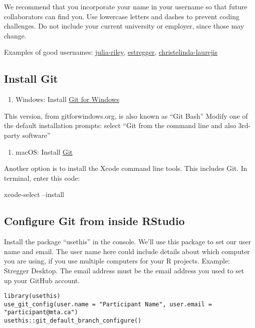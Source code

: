 \documentclass[
]{book}
\providecommand{\tightlist}{%
  \setlength{\itemsep}{0pt}\setlength{\parskip}{0pt}}
\begin{document}
We recommend that you incorporate your name in your username so that future collaborators can find you. Use lowercase letters and dashes to prevent coding challenges. Do not include your current university or employer, since those may change.

Examples of good usernames: \href{https://github.com/julia-riley}{julia-riley}, \href{https://github.com/estregger}{estregger}, \href{https://github.com/christelinda-laureijs}{christelinda-laurejis}

\subsection{Install Git}\label{install-git}

\begin{enumerate}
\def\labelenumi{\arabic{enumi}.}
\tightlist
\item
  Windows: Install \href{https://gitforwindows.org/}{Git for Windows}
\end{enumerate}

This version, from gitforwindows.org, is also known as ``Git Bash'' Modify one of the default installation prompts: select ``Git from the command line and also 3rd-party software''

\begin{enumerate}
\def\labelenumi{\arabic{enumi}.}
\setcounter{enumi}{1}
\tightlist
\item
  macOS: Install \href{https://git-scm.com/downloads}{Git}
\end{enumerate}

Another option is to install the Xcode command line tools. This includes Git. In terminal, enter this code:

xcode-select --install

\subsection{Configure Git from inside RStudio}\label{configure-git-from-inside-rstudio}

Install the package ``usethis'' in the console. We'll use this package to set our user name and email. The user name here could include details about which computer you are using, if you use multiple computers for your R projects. Example: Stregger Desktop. The email address must be the email address you used to set up your GitHub account.

\begin{verbatim}
library(usethis)
use_git_config(user.name = "Participant Name", user.email = "participant@mta.ca")
usethis::git_default_branch_configure()
\end{verbatim}
\end{document}
